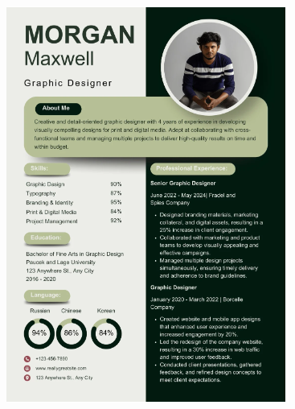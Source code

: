 \documentclass[handout]{beamer}
\begin{document}
\begin{frame}
\begin{columns}
\begin{column}{.45\textwidth}
\begin{figure}
      \includegraphics[width=\columnwidth]{img/cv6.png}
    \end{figure}
  \end{column}
\end{columns}
\end{frame}
\end{document}
